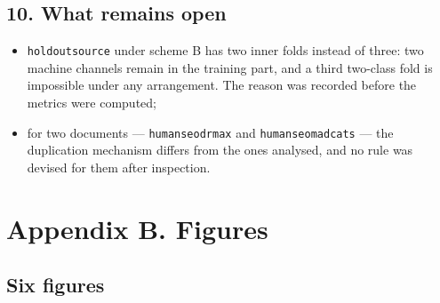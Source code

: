 \documentclass[11pt,a4paper]{article}
\renewcommand{\_}{\textunderscore\allowbreak}
\begin{document}
\subsection{10. What remains open}

\begin{itemize}
\item \texttt{holdout\_source} under scheme B has two inner folds instead of three: two machine channels remain in the training part, and a third two-class fold is impossible under any arrangement. The reason was recorded before the metrics were computed;
\item for two documents — \texttt{human\_seo\_drmax\_0013} and \texttt{human\_seo\_madcats\_0005} — the duplication mechanism differs from the ones analysed, and no rule was devised for them after inspection.
\end{itemize}

\section{Appendix B. Figures}

\subsection{Six figures}
\end{document}

